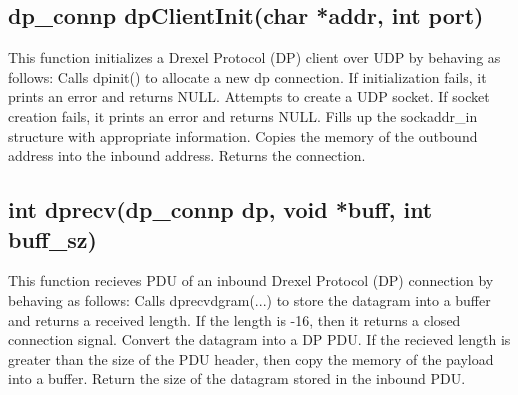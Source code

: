 \documentclass[12pt, a4paper]{article}
\begin{document}
{\subsection{dp\_connp dpClientInit(char *addr, int port)}
This function initializes a Drexel Protocol (DP) client over UDP by behaving as follows: \newline
\indent Calls dpinit() to allocate a new dp connection. If initialization fails, it \newline 
\indent\indent prints an error and returns NULL. \newline
\indent Attempts to create a UDP socket. If socket creation fails, it prints an \newline
\indent\indent error and returns NULL. \newline
\indent Fills up the sockaddr\_in structure with appropriate information. \newline
\indent Copies the memory of the outbound address into the inbound address. \newline
\indent Returns the connection.

\subsection{int dprecv(dp\_connp dp, void *buff, int buff\_sz)}
This function recieves PDU of an inbound Drexel Protocol (DP) connection by behaving as follows: \newline
\indent Calls dprecvdgram(...) to store the datagram into a buffer and returns a \newline
\indent\indent received length. If the length is -16, then it returns a closed connection \newline
\indent\indent signal. \newline
\indent Convert the datagram into a DP PDU. \newline
\indent If the recieved length is greater than the size of the PDU header, then \newline
\indent\indent copy the memory of the payload into a buffer. \newline
\indent Return the size of the datagram stored in the inbound PDU.

}
\end{document}
